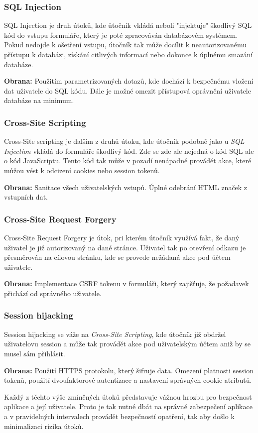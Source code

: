 \subsubsection*{SQL Injection}
\label{subsubsec:security-attacks-sql-injection}
SQL Injection je druh útoků, kde ůtočník vkládá neboli "injektuje" škodlivý SQL kód do vstupu formuláře, který je poté zpracováván databázovém systémem. Pokud nedojde k ošetření vstupu, útočník tak může docílit k neautorizovanému přístupu k databázi, získání citlivých informací nebo dokonce k úplnému smazání databáze.

\textbf{Obrana:} Použitím parametrizovaných dotazů, kde dochází k bezpečnému vložení dat uživatele do SQL kódu. Dále je možné omezit přístupová oprávnění uživatele databáze na minimum.

\subsubsection*{Cross-Site Scripting}
\label{subsubsec:security-attacks-cross-site-scripting}
Cross-Site scripting je dalším z druhů útoku, kde útočník podobně jako u \textit{SQL Injection} vkládá do formuláře škodlivý kód. Zde se zde ale nejedná o kód SQL ale o kód JavaScriptu. Tento kód tak může v pozadí nenápadně provádět akce, které můžou vést k odcizení cookies nebo session tokenů.

\textbf{Obrana:} Sanitace všech uživatelských vstupů. Úplné odebrání HTML značek z vstupních dat.

\subsubsection*{Cross-Site Request Forgery}
\label{subsubsec:security-attacks-cross-site-request-forgery}
Cross-Site Request Forgery je útok, pri kterém útočník využívá fakt, že daný uživatel je již autorizovaný na dané stránce. Uživatel tak po otevření odkazu je přesměrován na cílovou stránku, kde se provede nežádaná akce pod účtem uživatele.

\textbf{Obrana:} Implementace CSRF tokenu v formuláři, který zajišťuje, že požadavek přichází od správného uživatele.

\subsubsection*{Session hijacking}
\label{subsubsec:security-attacks-session-hijacking}
Session hijacking se váže na \textit{Cross-Site Scripting}, kde útočník již obdržel uživatelovu session a může tak provádět akce pod uživatelským účtem aniž by se musel sám přihlásit.

\textbf{Obrana:} Použití HTTPS protokolu, který šifruje data. Omezení platnosti session tokenů, použití dvoufaktorové autentizace a nastavení správných cookie atributů.
\newline

Každý z těchto výše zmíněných útoků představuje vážnou hrozbu pro bezpečnost aplikace a její uživatele. Proto je tak nutné dbát na správné zabezpečení aplikace a v pravidelných intervalech provádět bezpečností opatření, tak aby došlo k minimalizaci rizika útoků.

\endinput
